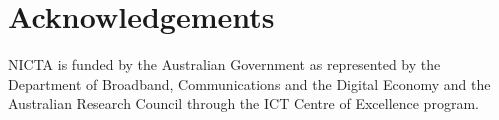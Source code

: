 \documentclass[letterpaper]{article}
\begin{document}
{\footnotesize
\section*{Acknowledgements}

NICTA is funded by the Australian Government as represented by
the Department of Broadband, Communications and the Digital
Economy and the Australian Research Council through the ICT
Centre of Excellence program.
}




\end{document}
